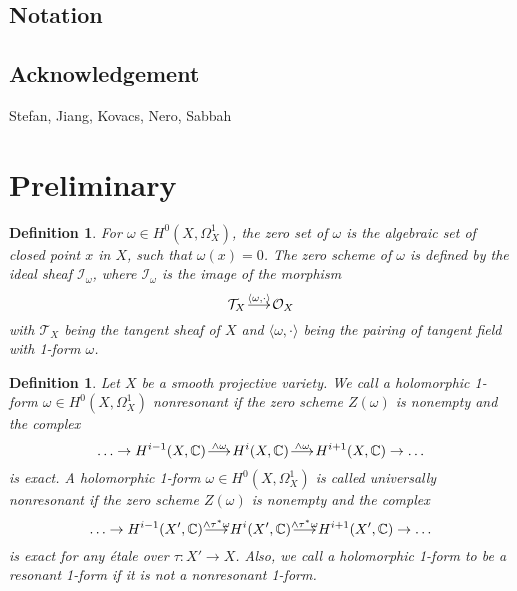 \documentclass[a4paper,12pt,reqno]{amsart}
\makeatletter
\theoremstyle{plain}
\newtheorem{definition}[theorem]{Definition}
\theoremstyle{remark}
\newcommand{\C}{\mathbb C}
\renewcommand{\longrightarrow}{\xymatrix@1@=15pt{\ar[r]&}}
\makeatother
\begin{document}
\subsection*{Notation}

































\subsection*{Acknowledgement} 

Stefan, Jiang, Kovacs, Nero, Sabbah

\section{Preliminary}



\begin{definition}
For $\omega\in H^0(X, \Omega_X^1)$, the zero set of $\omega$ is the algebraic set of closed point $x$ in $X$, such that $\omega(x)=0$. The zero scheme of $\omega$ is defined by the ideal sheaf $\mathcal{I}_{\omega}$, where  $\mathcal{I}_{\omega}$ is the image of the morphism $$\mathcal{T}_X\overset{\langle\omega, \cdot\rangle}{\longrightarrow} \mathcal{O}_X$$ with $\mathcal{T}_X$ being the tangent sheaf of $X$ and $\langle\omega, \cdot\rangle$ being the pairing of tangent field with 1-form $\omega$.
\end{definition}


\begin{definition}
Let $X$ be a smooth projective variety. We call a holomorphic 1-form $\omega\in H^0(X, \Omega_X^1)$ nonresonant if the zero scheme $Z(\omega)$ is nonempty and the complex $$\ldots\to H^{i-1}(X,\C)\overset{\wedge\omega}{\longrightarrow}H^{i}(X,\C)\overset{\wedge\omega}{\longrightarrow}H^{i+1}(X,\C)\to\ldots$$ is exact. A holomorphic 1-form $\omega\in H^0(X, \Omega_X^1)$ is called universally nonresonant if the zero scheme $Z(\omega)$ is nonempty and the complex $$\ldots\to H^{i-1}(X',\C)\overset{\wedge\tau^*\omega}{\longrightarrow}H^{i}(X',\C)\overset{\wedge\tau^*\omega}{\longrightarrow}H^{i+1}(X',\C)\to\ldots$$ is exact for any \'etale over $\tau: X'\to X$. Also, we call a holomorphic 1-form to be a resonant 1-form if it is not a nonresonant 1-form.
\end{definition}
\end{document}
